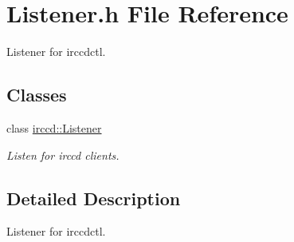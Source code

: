 \hypertarget{a00085}{\section{Listener.\-h File Reference}
\label{a00085}
}


Listener for irccdctl.  


\subsection*{Classes}
\begin{DoxyCompactItemize}
\item 
class \hyperlink{a00038}{irccd\-::\-Listener}
\begin{DoxyCompactList}\small\item\em Listen for irccd clients. \end{DoxyCompactList}\end{DoxyCompactItemize}


\subsection{Detailed Description}
Listener for irccdctl. 